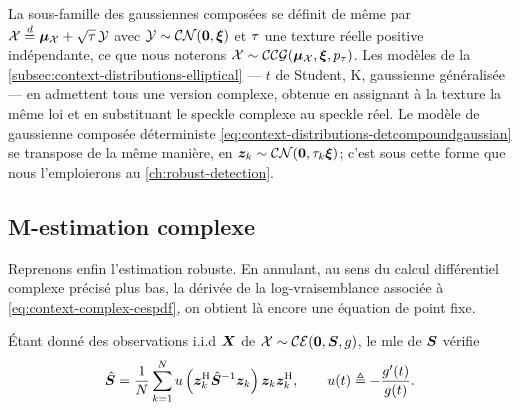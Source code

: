   La sous-famille des gaussiennes composées se définit de même par $\mathcal{X} \overset{d}{=} \boldsymbol{\mu}_{\mathcal{X}} + \sqrt{\tau}\,\mathcal{Y}$ avec $\mathcal{Y}\sim\mathcal{CN}(\boldsymbol{0},\boldsymbol{\xi})$ et $\tau$ une texture réelle positive indépendante, ce que nous noterons $\mathcal{X}\sim\mathcal{CCG}(\boldsymbol{\mu}_{\mathcal{X}},\boldsymbol{\xi},p_{\tau})$. Les modèles de la \cref{subsec:context-distributions-elliptical} — $t$ de Student, K, gaussienne généralisée — en admettent tous une version complexe, obtenue en assignant à la texture la même loi et en substituant le speckle complexe au speckle réel. Le modèle de gaussienne composée déterministe \cref{eq:context-distributions-detcompoundgaussian} se transpose de la même manière, en $\boldsymbol{z}_k\sim\mathcal{CN}(\boldsymbol{0},\tau_k\boldsymbol{\xi})$; c'est sous cette forme que nous l'emploierons au \cref{ch:robust-detection}. 


\subsection{M-estimation complexe}
\label{subsec:context-complex-mestimation}

Reprenons enfin l'estimation robuste. En annulant, au sens du calcul différentiel complexe précisé plus bas, la dérivée de la log-vraisemblance associée à \cref{eq:context-complex-cespdf}, on obtient là encore une équation de point fixe.

\begin{proposition}
\label{prop:context-complex-mlefixedpoint}
  \'Etant donné des observations i.i.d $\boldsymbol{X}$ de $\mathcal{X}\sim\mathcal{CE}(\boldsymbol{0},\boldsymbol{S},g)$, le mle de $\boldsymbol{S}$ vérifie
  \begin{equation}
    \hat{\boldsymbol{S}}
    =
    \frac{1}{N}\sum_{k=1}^{N}
    u\left(\boldsymbol{z}_k^{\mathrm{H}} {\hat{\boldsymbol{S}}}^{-1} \boldsymbol{z}_k\right)
    \boldsymbol{z}_k\boldsymbol{z}_k^{\mathrm{H}},
    \qquad
    u(t) \triangleq -\frac{g'(t)}{g(t)}.
    \label{eq:context-complex-fixedpoint}
  \end{equation}
\end{proposition}

